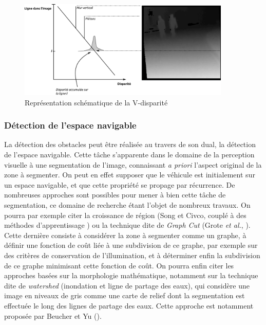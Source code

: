 \begin{figure}
	\centering
	\includegraphics[width=0.9\textwidth]{Chapter2/graphics/v-disparity.png}
	\caption{Représentation schématique de la \og V-disparité\fg{}}
	\label{fig:ch2_v_disp}
\end{figure}

\subsubsection{Détection de l'espace navigable}
La détection des obstacles peut être réalisée au travers de son dual, la détection de l'espace navigable. Cette tâche s'apparente dans le domaine de la perception visuelle à une segmentation de l'image, connaissant \textit{a priori} l'aspect original de la zone à segmenter. On peut en effet supposer que le véhicule est initialement sur un espace navigable, et que cette propriété se propage par récurrence. De nombreuses approches sont possibles pour mener à bien cette tâche de segmentation, ce domaine de recherche étant l'objet de nombreux travaux. On pourra par exemple citer la croissance de région (Song et Civco, couplé à des méthodes d'apprentissage \cite{Song2004}) ou la technique dite de \emph{Graph Cut} (Grote \textit{et al.}, \cite{Grote2007}). Cette dernière consiste à considérer la zone à segmenter comme un graphe, à définir une fonction de coût liée à une subdivision de ce graphe, par exemple sur des critères de conservation de l'illumination, et à déterminer enfin la subdivision de ce graphe minimisant cette fonction de coût. On pourra enfin citer les approches basées sur la morphologie mathématique, notamment sur la technique dite de \emph{watershed} (inondation et ligne de partage des eaux), qui considère une image en niveaux de gris comme une carte de relief dont la segmentation est effectuée le long des lignes de partage des eaux. Cette approche est notamment proposée par Beucher et Yu (\cite{Beucher1994}).

